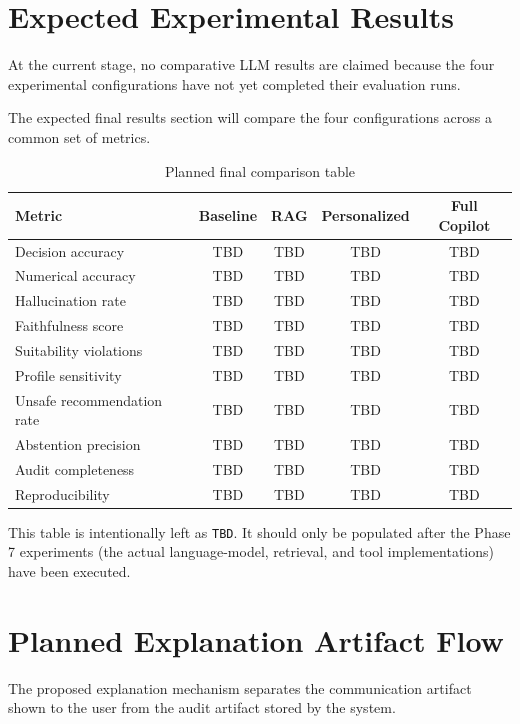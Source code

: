 \documentclass[12pt,a4paper]{article}
\begin{document}
\section{Expected Experimental Results}

At the current stage, no comparative LLM results are claimed because the four experimental configurations have not yet completed their evaluation runs.

The expected final results section will compare the four configurations across a common set of metrics.

\begin{table}[H]
\centering
\caption{Planned final comparison table}
\label{tab:finalplanned}
\begin{tabular}{lcccc}
\toprule
Metric & Baseline & RAG & Personalized & Full Copilot\\
\midrule
Decision accuracy & TBD & TBD & TBD & TBD\\
Numerical accuracy & TBD & TBD & TBD & TBD\\
Hallucination rate & TBD & TBD & TBD & TBD\\
Faithfulness score & TBD & TBD & TBD & TBD\\
Suitability violations & TBD & TBD & TBD & TBD\\
Profile sensitivity & TBD & TBD & TBD & TBD\\
Unsafe recommendation rate & TBD & TBD & TBD & TBD\\
Abstention precision & TBD & TBD & TBD & TBD\\
Audit completeness & TBD & TBD & TBD & TBD\\
Reproducibility & TBD & TBD & TBD & TBD\\
\bottomrule
\end{tabular}
\end{table}

This table is intentionally left as \texttt{TBD}. It should only be populated after the Phase 7 experiments (the actual language-model, retrieval, and tool implementations) have been executed.

\section{Planned Explanation Artifact Flow}

The proposed explanation mechanism separates the communication artifact shown to the user from the audit artifact stored by the system.
\end{document}
